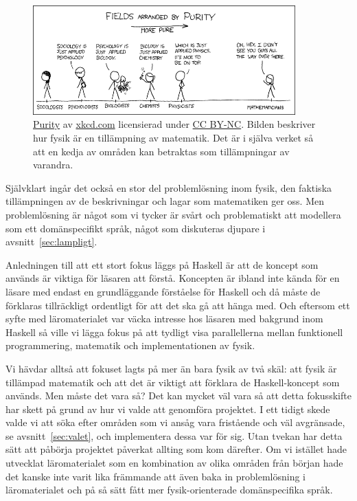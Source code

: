 \begin{figure}[tph]
  \centering
  \includegraphics[width=0.9\textwidth]{figure/purity.png}
  \caption{\href{https://xkcd.com/435/}{Purity} av
  \href{https://xkcd.com}{xkcd.com} licensierad under
\href{https://creativecommons.org/licenses/by-nc/2.5/}{CC BY-NC}. Bilden beskriver hur fysik är en tillämpning av matematik. Det är i själva verket
så att en kedja av områden kan betraktas som tillämpningar av
varandra.}\label{fig:xkcd} 
\end{figure}

Självklart ingår det också en stor del problemlösning inom fysik, den faktiska
tillämpningen av de beskrivningar och lagar som matematiken ger oss. Men
problemlösning är något som vi tycker är svårt och problematiskt att modellera
som ett domänspecifikt språk, något som diskuteras djupare i
avsnitt~\ref{sec:lampligt}.

Anledningen till att ett stort fokus läggs på Haskell är att de koncept som används är viktiga för läsaren att förstå. Koncepten är ibland inte kända för en läsare med endast en grundläggande förståelse för Haskell och då måste de förklaras tillräckligt ordentligt för att det ska gå att hänga med. Och
eftersom ett syfte med läromaterialet var väcka intresse hos läsaren med
bakgrund inom Haskell så ville vi lägga fokus på att tydligt visa
parallellerna mellan funktionell programmering, matematik och implementationen
av fysik. 

Vi hävdar alltså att fokuset lagts på mer än bara fysik av två skäl: att fysik är tillämpad matematik och att det är viktigt att förklara de Haskell-koncept som används. Men måste
det vara så? Det kan mycket väl vara så att detta fokusskifte har skett på grund
av hur vi valde att genomföra projektet. I ett tidigt skede valde vi att söka efter
områden som vi ansåg vara fristående och väl avgränsade, se avsnitt~\ref{sec:valet},
och implementera dessa var för sig. Utan tvekan har detta sätt att påbörja
projektet påverkat allting som kom därefter. Om vi istället hade utvecklat
läromaterialet som en kombination av olika områden från början hade det kanske
inte varit lika främmande att även baka in problemlösning i läromaterialet och på så sätt
fått mer fysik-orienterade domänspecifika språk.

